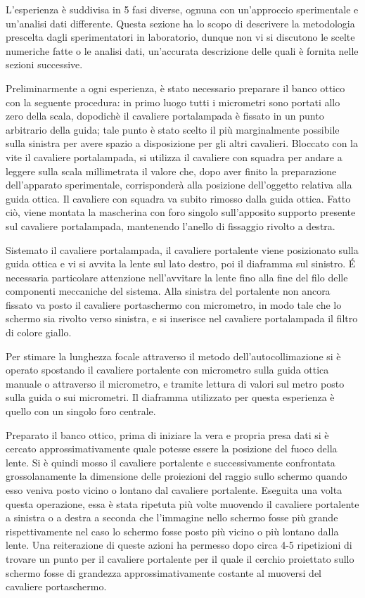 L'esperienza \`e suddivisa in 5 fasi diverse, ognuna con un'approccio sperimentale e un'analisi dati differente. Questa sezione ha lo scopo di descrivere la metodologia prescelta dagli sperimentatori in laboratorio, dunque non vi si discutono le scelte numeriche fatte o le analisi dati, un'accurata descrizione delle quali è fornita nelle sezioni successive.


Preliminarmente a ogni esperienza, è stato necessario preparare il banco ottico con la seguente procedura: in primo luogo tutti i micrometri sono portati allo zero della scala, dopodichè il cavaliere portalampada \`e fissato in un punto arbitrario della guida; tale punto è stato scelto il più marginalmente possibile sulla sinistra per avere spazio a disposizione per gli altri cavalieri. Bloccato con la vite il cavaliere portalampada, si utilizza il cavaliere con squadra per andare a leggere sulla scala millimetrata il valore che, dopo aver finito la preparazione dell'apparato sperimentale, corrisponder\`a alla posizione dell'oggetto relativa alla guida ottica. Il cavaliere con squadra va subito rimosso dalla guida ottica. Fatto ciò, viene montata la mascherina con foro singolo sull'apposito supporto presente sul cavaliere portalampada, mantenendo l'anello di fissaggio rivolto a destra. 

Sistemato il cavaliere portalampada, il cavaliere portalente viene posizionato sulla guida ottica e vi si avvita la lente sul lato destro, poi il diaframma sul sinistro. \'E necessaria particolare attenzione nell'avvitare la lente fino alla fine del filo delle componenti meccaniche del sistema. Alla sinistra del portalente non ancora fissato va posto il cavaliere portaschermo con micrometro, in modo tale che lo schermo sia rivolto verso sinistra, e si inserisce nel cavaliere portalampada il filtro di colore giallo.


Per stimare la lunghezza focale attraverso il metodo dell'autocollimazione si è operato spostando il cavaliere portalente con micrometro sulla guida ottica manuale o attraverso il micrometro, e tramite lettura di valori sul metro posto sulla guida o sui micrometri. Il diaframma utilizzato per questa esperienza è quello con un singolo foro centrale. 

Preparato il banco ottico, prima di iniziare la vera e propria presa dati si è cercato approssimativamente quale potesse essere la posizione del fuoco della lente. Si è quindi mosso il cavaliere portalente e successivamente confrontata grossolanamente la dimensione delle proiezioni del raggio sullo schermo quando esso veniva posto vicino o lontano dal cavaliere portalente. Eseguita una volta questa operazione, essa è stata ripetuta più volte muovendo il cavaliere portalente a sinistra o a destra a seconda che l'immagine nello schermo fosse più grande rispettivamente nel caso lo schermo fosse posto più vicino o più lontano dalla lente. Una reiterazione di queste azioni ha permesso dopo circa 4-5 ripetizioni di trovare un punto per il cavaliere portalente per il quale il cerchio proiettato sullo schermo fosse di grandezza approssimativamente costante al muoversi del cavaliere portaschermo. 


